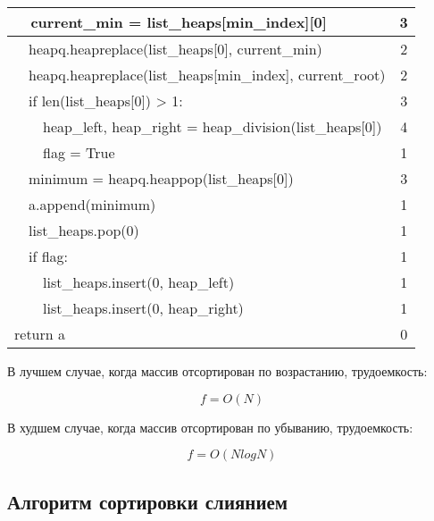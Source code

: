 \begin{table}[H]
\begin{center}
\begin{threeparttable}
\begin{tabular}{|l|c|}
				\hline
				~~current\_min = list\_heaps[min\_index][0] & 3\\
				\hline
				~~heapq.heapreplace(list\_heaps[0], current\_min) & 2\\
				\hline
				~~heapq.heapreplace(list\_heaps[min\_index], current\_root) & 2\\
				\hline
				~~if len(list\_heaps[0]) > 1: & 3\\
				\hline
				~~~~heap\_left, heap\_right = heap\_division(list\_heaps[0]) & 4\\
				\hline
				~~~~flag = True & 1\\
				\hline
				~~minimum = heapq.heappop(list\_heaps[0]) & 3\\
				\hline
				~~a.append(minimum) & 1\\
				\hline
				~~list\_heaps.pop(0) & 1\\
				\hline
				~~if flag: & 1\\
				\hline
				~~~~list\_heaps.insert(0, heap\_left) & 1\\
				\hline
				~~~~list\_heaps.insert(0, heap\_right) & 1\\
				\hline
				return a & 0\\
				\hline
			\end{tabular}
		\end{threeparttable}
	\end{center}
\end{table}

В лучшем случае, когда массив отсортирован по возрастанию, трудоемкость:

\begin{equation}
	f = O(N)
\end{equation}

В худшем случае, когда массив отсортирован по убыванию, трудоемкость:

\begin{equation}
	f = O(NlogN)
\end{equation}

\subsection{Алгоритм сортировки слиянием}

